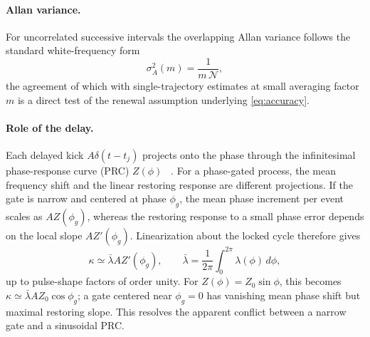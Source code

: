 \documentclass[aps,pre,reprint,amsmath,amssymb,floatfix,nofootinbib]{revtex4-2}
\begin{document}
\paragraph*{Allan variance.}
For uncorrelated successive intervals the overlapping Allan variance
follows the standard white-frequency form~\cite{Allan1966}
\begin{equation}
  \sigma_A^2(m) = \frac{1}{m\,\mathcal{N}},
  \label{eq:allan}
\end{equation}
the agreement of which with single-trajectory estimates at small averaging
factor $m$ is a direct test of the renewal assumption underlying
\eqref{eq:accuracy}.

\paragraph*{Role of the delay.}
Each delayed kick $A\delta(t-t_j)$ projects onto the phase through the
infinitesimal phase-response curve (PRC) $Z(\phi)$
~\cite{Kuramoto1984,Pikovsky2001}. For a phase-gated process, the mean
frequency shift and the linear restoring response are different
projections. If the gate is narrow and centered at phase $\phi_g$, the
mean phase increment per event scales as $A Z(\phi_g)$, whereas the
restoring response to a small phase error depends on the local slope
$A Z'(\phi_g)$. Linearization about the locked cycle therefore gives
\begin{equation}
  \kappa \simeq \bar\lambda A Z'(\phi_g),
  \qquad
  \bar\lambda = \frac{1}{2\pi}\int_0^{2\pi}\lambda(\phi)\,d\phi,
  \label{eq:kappa_gate}
\end{equation}
up to pulse-shape factors of order unity. For $Z(\phi)=Z_0\sin\phi$,
this becomes $\kappa\simeq \bar\lambda A Z_0\cos\phi_g$; a gate centered
near $\phi_g=0$ has vanishing mean phase shift but maximal restoring
slope. This resolves the apparent conflict between a narrow gate and a
sinusoidal PRC.
\end{document}

